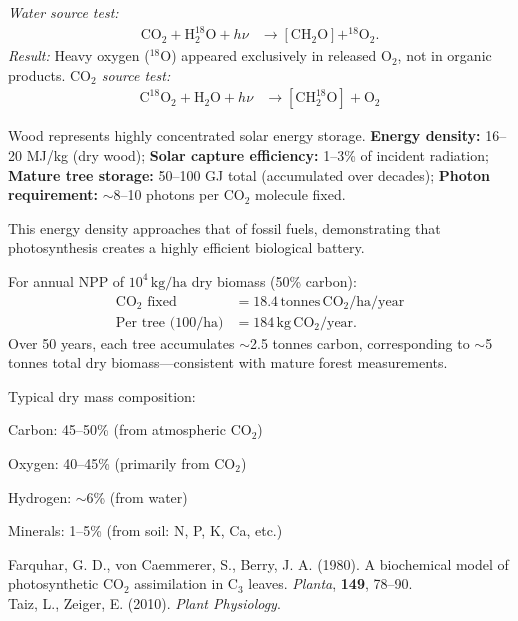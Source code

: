 \begin{technical}
\noindent\textit{Water source test:}
\begin{align*}
\mathrm{CO}_2 + \mathrm{H}_2^{18}\mathrm{O} + h\nu 
&\rightarrow [\mathrm{CH}_2\mathrm{O}] + ^{18}\mathrm{O}_2.
\end{align*}
\textit{Result:} Heavy oxygen ($^{18}\mathrm{O}$) appeared exclusively in released $\mathrm{O}_2$, not in organic products.
\noindent\textit{$\mathrm{CO}_2$ source test:}
\begin{align*}
\mathrm{C}^{18}\mathrm{O}_2 + \mathrm{H}_2\mathrm{O} + h\nu 
&\rightarrow [\mathrm{CH}_2^{18}\mathrm{O}] + \mathrm{O}_2
\end{align*}

\vspace{0.5em}

\vspace{0.2em}
\noindent Wood represents highly concentrated solar energy storage. \textbf{Energy density:} 16–20 MJ/kg (dry wood); \textbf{Solar capture efficiency:} 1–3\% of incident radiation; \textbf{Mature tree storage:} 50–100 GJ total (accumulated over decades); \textbf{Photon requirement:} ${\sim}$8–10 photons per $\mathrm{CO}_2$ molecule fixed.

\vspace{0.3em}
\noindent This energy density approaches that of fossil fuels, demonstrating that photosynthesis creates a highly efficient biological battery.

\vspace{0.5em}

\vspace{0.2em}
\noindent For annual NPP of $10^4\,\mathrm{kg/ha}$ dry biomass (50\% carbon):
\begin{align*}
\text{$\mathrm{CO}_2$ fixed} &= 18.4\,\mathrm{tonnes}\,\mathrm{CO}_2/\mathrm{ha}/\mathrm{year} \\
\text{Per tree (100/ha)} &= 184\,\mathrm{kg}\,\mathrm{CO}_2/\mathrm{year}.
\end{align*}
Over 50 years, each tree accumulates $\sim$2.5 tonnes carbon, corresponding to $\sim$5 tonnes total dry biomass—consistent with mature forest measurements.

\vspace{0.5em}

\vspace{0.2em}
\noindent Typical dry mass composition:

\noindent Carbon: 45–50\% (from atmospheric $\mathrm{CO}_2$)

\noindent Oxygen: 40–45\% (primarily from $\mathrm{CO}_2$)

\noindent Hydrogen: $\sim$6\% (from water)

\noindent Minerals: 1–5\% (from soil: N, P, K, Ca, etc.)

\techref
{\footnotesize
Farquhar, G. D., von Caemmerer, S., Berry, J. A. (1980). A biochemical model of photosynthetic $\mathrm{CO}_2$ assimilation in C$_3$ leaves. \textit{Planta}, \textbf{149}, 78–90.\\
Taiz, L., Zeiger, E. (2010). \textit{Plant Physiology}.
}
\end{technical}
